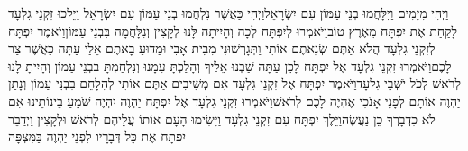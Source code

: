 \documentclass[../main/main.tex]{subfiles}
\begin{document}
\begin{multicols*}{\ncols}
וַיְהִי מִיָּמִים וַיִּלָּחֲמוּ בְנֵי עַמּוֹן עִם יִשְׂרָאֵל\PreVerseSpace{}וַיְהִי כַּאֲשֶׁר נִלְחֲמוּ בְנֵי עַמּוֹן עִם יִשְׂרָאֵל וַיֵּלְכוּ זִקְנֵי גִלְעָד לָקַחַת אֶת יִפְתָּח מֵאֶרֶץ טוֹב\PreVerseSpace{}וַיֹּאמְרוּ לְיִפְתָּח לְכָה וְהָיִיתָה לָּנוּ לְקָצִין וְנִלָּחֲמָה בִּבְנֵי עַמּוֹן\PreVerseSpace{}וַיֹּאמֶר יִפְתָּח לְזִקְנֵי גִלְעָד הֲלֹא אַתֶּם שְׂנֵאתֶם אוֹתִי וַתְּגָרְשׁוּנִי מִבֵּית אָבִי וּמַדּוּעַ בָּאתֶם אֵלַי עַתָּה כַּאֲשֶׁר צַר לָכֶם\PreVerseSpace{}וַיֹּאמְרוּ זִקְנֵי גִלְעָד אֶל יִפְתָּח לָכֵן עַתָּה שַׁבְנוּ אֵלֶיךָ וְהָלַכְתָּ עִמָּנוּ וְנִלְחַמְתָּ בִּבְנֵי עַמּוֹן וְהָיִיתָ לָּנוּ לְרֹאשׁ לְכֹל יֹשְׁבֵי גִלְעָד\PreVerseSpace{}וַיֹּאמֶר יִפְתָּח אֶל זִקְנֵי גִלְעָד אִם מְשִׁיבִים אַתֶּם אוֹתִי לְהִלָּחֵם בִּבְנֵי עַמּוֹן וְנָתַן יַהְוֶה אוֹתָם לְפָנָי אָנֹכִי אֶהְיֶה לָכֶם לְרֹאשׁ\PreVerseSpace{}וַיֹּאמְרוּ זִקְנֵי גִלְעָד אֶל יִפְתָּח יַהְוֶה יִהְיֶה שֹׁמֵעַ בֵּינוֹתֵינוּ אִם לֹא כִדְבָרְךָ כֵּן נַעֲשֶׂה\PreVerseSpace{}וַיֵּלֶךְ יִפְתָּח עִם זִקְנֵי גִלְעָד וַיָּשִׂימוּ הָעָם אוֹתוֹ עֲלֵיהֶם לְרֹאשׁ וּלְקָצִין וַיְדַבֵּר יִפְתָּח אֶת כָּל דְּבָרָיו לִפְנֵי יַהְוֶה בַּמִּצְפָּה\OpenSection{}\par

\end{multicols*}
\end{document}
